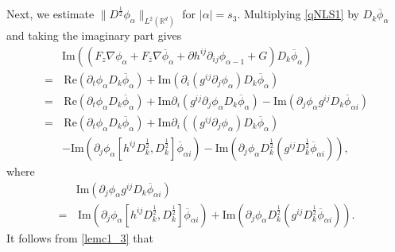 \documentclass[10pt,twoside,a4paper]{article}
\numberwithin{equation}{section}\allowdisplaybreaks
\begin{document}
Next, we estimate $ 		\|D^{\frac 12}\phi_\alpha \|_{L^{2}(\mathbb{R}^{d})}  $ for $ |\alpha|=s_3. $
Multiplying  \eqref{qNLS1} by
$D_k \overline{\phi}_{\alpha } $ 	and taking the imaginary part gives
\begin{align}  \label{ccons3}
	&\mathrm{Im} \left(  \left(F_z\nabla \phi_\alpha+F_{\overline{z}}\nabla \overline{\phi}_\alpha+\partial h^{ij}\partial_{ij } \phi_{\alpha -1}+G\right)D_k\overline{\phi}_{\alpha } \right)\nonumber\\
	=&\,\mathrm{Re}\left( \partial_t\phi_{\alpha } D_k\overline{\phi}_{\alpha }  \right)+ \mathrm{Im} \left(  \partial_i\left(   g^{ij} \partial_j \phi_{\alpha }\right)D_k \overline{\phi}_{\alpha }\right)\nonumber\\
	=&\, \mathrm{Re}\left( \partial_t\phi_{\alpha } D_k\overline{\phi}_{\alpha }  \right)+ \mathrm{Im} \partial_i\left(   g^{ij} \partial_j \phi_{\alpha }D_k \overline{\phi}_{\alpha }\right)- \mathrm{Im} \left(   \partial_j \phi_{\alpha } g^{ij} D_k \overline{\phi}_{\alpha i }\right)\nonumber\\
	=&\, \mathrm{Re}\left( \partial_t\phi_{\alpha } D_k \overline{\phi}_{\alpha }  \right)+ \mathrm{Im} \partial_i\left(  \left(   g^{ij} \partial_j \phi_{\alpha }\right) D_k \overline{\phi}_{\alpha }\right)\\
	&- \mathrm{Im} \left(   \partial_j \phi_{\alpha } \left[ h^{ij}  D_k^{\frac12}, D_k^{\frac12} \right] \overline{\phi}_{\alpha i }\right)-\mathrm{Im} \left(   \partial_j \phi_{\alpha } D_k^{\frac12}( g^{ij} D_k^{\frac12}  \overline{\phi}_{\alpha i })\right),\nonumber
\end{align}	
where 
\begin{align} \label{ccons3_c1}
	&	\mathrm{Im} \left(   \partial_j \phi_{\alpha }  g^{ij}  D_k  \overline{\phi}_{\alpha i }\right)\nonumber\\
	=&\, \mathrm{Im} \left(   \partial_j \phi_{\alpha } \left[ h^{ij}  D_k^{\frac12}, D_k^{\frac12} \right] \overline{\phi}_{\alpha i }\right)+\mathrm{Im} \left(   \partial_j \phi_{\alpha } D_k^{\frac12}( g^{ij} D_k^{\frac12}  \overline{\phi}_{\alpha i })\right).
\end{align}
It follows from \eqref{lemc1_3} that
\end{document}
